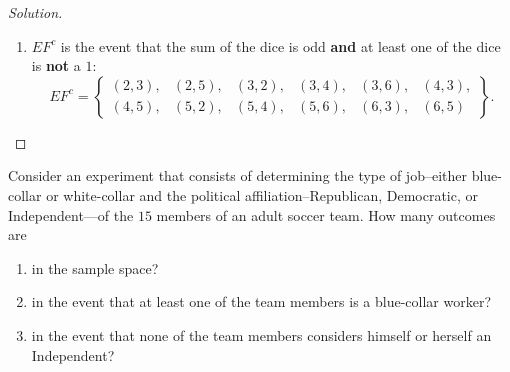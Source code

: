 \documentclass{article}[12pt]
\newenvironment{solution}
  {\renewcommand\qedsymbol{$\blacksquare$}\begin{proof}[Solution]}
  {\end{proof}}
\newenvironment{problem}[1]
  {\renewcommand\theinnercustomprblm{#1}\innercustomprblm}
  {\endinnercustomprblm}
\begin{document}
\begin{solution}
\begin{enumerate}
    \item $EF^{c}$ is the event that the sum of the dice is odd \textbf{and} at least one of the dice is \textbf{not} a $1$:
    \begin{equation*}
        EF^{c} = 
        \begin{Bmatrix}
        (2, 3), & (2, 5), & (3, 2), & (3, 4), & (3, 6), & (4, 3),
        \\
        (4, 5), & (5, 2), & (5, 4), & (5, 6), & (6, 3), & (6, 5)
        \end{Bmatrix}.
    \end{equation*}
\end{enumerate}
\end{solution}

\begin{problem}{7}\normalfont
Consider an experiment that consists of determining the type of job--either blue-collar or white-collar and the political affiliation--Republican, Democratic, or Independent—of the $15$ members of an adult soccer team.
How many outcomes are
\begin{enumerate}[label=(\alph*)]
    \item in the sample space?
    \item in the event that at least one of the team members is a blue-collar worker?
    \item in the event that none of the team members considers himself or herself an Independent?
\end{enumerate}
\end{problem}
\end{document}
